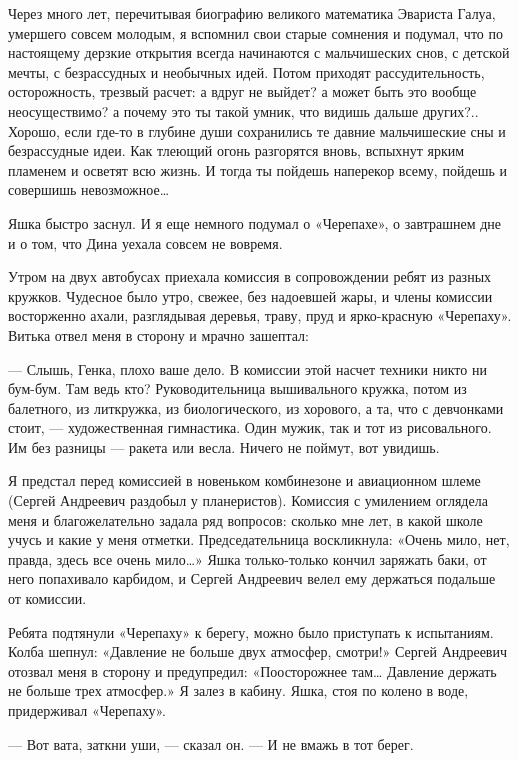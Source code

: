 Через много лет, перечитывая биографию великого математика Эвариста Галуа,
умершего совсем молодым, я вспомнил свои старые сомнения и подумал, что по
настоящему дерзкие  открытия  всегда  начинаются  с  мальчишеских  снов,  с
детской  мечты,   с  безрассудных   и  необычных   идей.  Потом   приходят
рассудительность, осторожность, трезвый расчет: а вдруг не выйдет? а может
быть это вообще  неосуществимо? а почему  это ты такой  умник, что  видишь
дальше других?.. Хорошо, если где-то в глубине души сохранились те  давние
мальчишеские сны и безрассудные идеи.  Как тлеющий огонь разгорятся  вновь,
вспыхнут ярким пламенем и осветят всю жизнь. И тогда ты пойдешь  наперекор
всему, пойдешь и совершишь невозможное…

Яшка быстро заснул. И я еще немного подумал о «Черепахе», о завтрашнем дне
и о том, что Дина уехала совсем не вовремя.

Утром на двух автобусах приехала комиссия в сопровождении ребят из  разных
кружков. Чудесное было утро, свежее, без надоевшей жары, и члены  комиссии
восторженно  ахали,  разглядывая  деревья,  траву,  пруд  и   ярко-красную
«Черепаху». Витька отвел меня в сторону и мрачно зашептал:

— Слышь, Генка, плохо ваше дело.  В комиссии этой насчет техники никто  ни
бум-бум. Там  ведь кто?  Руководительница  вышивального кружка,  потом  из
балетного, из  литкружка, из  биологического,  из хорового,  а та,  что  с
девчонками стоит, — художественная  гимнастика. Один мужик,  так и тот  из
рисовального. Им без  разницы — ракета  или весла. Ничего  не поймут,  вот
увидишь.

Я предстал перед  комиссией в  новеньком комбинезоне  и авиационном  шлеме
(Сергей Андреевич раздобыл  у планеристов). Комиссия  с умилением  оглядела
меня и благожелательно задала ряд вопросов: сколько мне лет, в какой школе
учусь и какие у меня  отметки. Председательница воскликнула: «Очень  мило,
нет, правда, здесь  все очень  мило…» Яшка  только-только кончил  заряжать
баки, от него попахивало карбидом, и Сергей Андреевич велел ему  держаться
подальше от комиссии.

Ребята подтянули «Черепаху» к берегу, можно было приступать к  испытаниям.
Колба шепнул: «Давление не больше двух атмосфер, смотри!» Сергей Андреевич
отозвал меня в сторону и предупредил: «Поосторожнее там… Давление  держать
не больше трех атмосфер.» Я залез в  кабину. Яшка, стоя по колено в  воде,
придерживал «Черепаху».

— Вот вата, заткни уши, — сказал он. — И не вмажь в тот берег.

